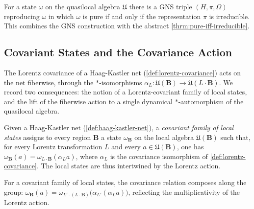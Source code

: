 \begin{theorem}
    \label{thrm:pure-iff-irreducible-quasilocal}
    \leanok
    For a state $\omega$ on the quasilocal algebra $\mathfrak{U}$ there is a GNS triple $(H, \pi, \Omega)$ reproducing $\omega$ in which $\omega$ is pure if and only if the representation $\pi$ is irreducible. This combines the GNS construction with the abstract \ref{thrm:pure-iff-irreducible}.
\end{theorem}

\subsection{Covariant States and the Covariance Action}

The Lorentz covariance of a Haag-Kastler net (\ref{def:lorentz-covariance}) acts on the net fiberwise, through the $*$-isomorphisms $\alpha_L : \mathfrak{U}(\mathbf{B}) \to \mathfrak{U}(L\cdot\mathbf{B})$. We record two consequences: the notion of a Lorentz-covariant family of local states, and the lift of the fiberwise action to a single dynamical $*$-automorphism of the quasilocal algebra.

\begin{definition}
    \label{def:covariant-state-family}
    \leanok
    Given a Haag-Kastler net (\ref{def:haag-kastler-net}), a \emph{covariant family of local states} assigns to every region $\mathbf{B}$ a state $\omega_{\mathbf{B}}$ on the local algebra $\mathfrak{U}(\mathbf{B})$ such that, for every Lorentz transformation $L$ and every $a \in \mathfrak{U}(\mathbf{B})$, one has $\omega_{\mathbf{B}}(a) = \omega_{L\cdot\mathbf{B}}(\alpha_L a)$, where $\alpha_L$ is the covariance isomorphism of \ref{def:lorentz-covariance}. The local states are thus intertwined by the Lorentz action.
\end{definition}

\begin{lemma}
    \label{lmm:covariant-state-family-compose}
    \leanok
    For a covariant family of local states, the covariance relation composes along the group: $\omega_{\mathbf{B}}(a) = \omega_{L'\cdot(L\cdot\mathbf{B})}\big(\alpha_{L'}(\alpha_L a)\big)$, reflecting the multiplicativity of the Lorentz action.
\end{lemma}

